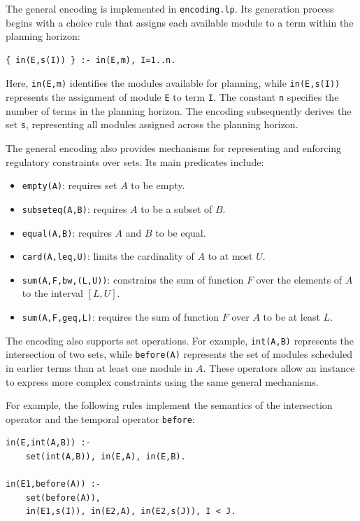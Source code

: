 \documentclass[10pt,a4paper]{article}
\begin{document}
The general encoding is implemented in \texttt{encoding.lp}. Its generation process begins with a choice rule that assigns each available module to a term within the planning horizon:

\begin{lstlisting}[caption={Module-to-term assignment in the general encoding},label={lst:module-assignment}]
{ in(E,s(I)) } :- in(E,m), I=1..n.
\end{lstlisting}

Here, \texttt{in(E,m)} identifies the modules available for planning, while \texttt{in(E,s(I))} represents the assignment of module \texttt{E} to term \texttt{I}. The constant \texttt{n} specifies the number of terms in the planning horizon. The encoding subsequently derives the set \texttt{s}, representing all modules assigned across the planning horizon.

The general encoding also provides mechanisms for representing and enforcing regulatory constraints over sets. Its main predicates include:
\begin{itemize}
    \item \texttt{empty(A)}: requires set $A$ to be empty.
    \item \texttt{subseteq(A,B)}: requires $A$ to be a subset of $B$.
    \item \texttt{equal(A,B)}: requires $A$ and $B$ to be equal.
    \item \texttt{card(A,leq,U)}: limits the cardinality of $A$ to at most $U$.
    \item \texttt{sum(A,F,bw,(L,U))}: constrains the sum of function $F$ over the elements of $A$ to the interval $[L,U]$.
    \item \texttt{sum(A,F,geq,L)}: requires the sum of function $F$ over $A$ to be at least $L$.
\end{itemize}

The encoding also supports set operations. For example, \texttt{int(A,B)} represents the intersection of two sets, while \texttt{before(A)} represents the set of modules scheduled in earlier terms than at least one module in $A$. These operators allow an instance to express more complex constraints using the same general mechanisms.

For example, the following rules implement the semantics of the intersection operator and the temporal operator \texttt{before}:

\begin{lstlisting}[caption={Set intersection and temporal ordering operators},label={lst:set-operators}]
in(E,int(A,B)) :-
    set(int(A,B)), in(E,A), in(E,B).

in(E1,before(A)) :-
    set(before(A)),
    in(E1,s(I)), in(E2,A), in(E2,s(J)), I < J.
\end{lstlisting}
\end{document}
